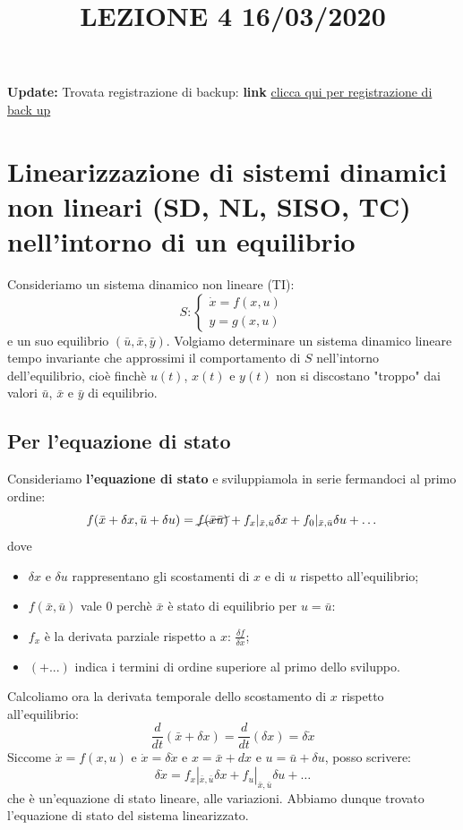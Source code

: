 \newpage
\title{LEZIONE 4 16/03/2020} \newline
\textbf{Update:} Trovata registrazione di backup: \textbf{link} \href{https://onedrive.live.com/?authkey=%21AATVJK3srNwxGzs&id=EE092FF4FF7B5B0E%212158&cid=EE092FF4FF7B5B0E}{clicca qui per registrazione di back up}
\section{Linearizzazione di sistemi dinamici non lineari (SD, NL, SISO, TC) nell'intorno di un equilibrio}
Consideriamo un sistema dinamico non lineare (TI):
\[
    S: \begin{cases}
        \dot{x} = f(x,u)\\
        y = g(x,u)
    \end{cases}
\]
e un suo equilibrio $(\bar{u}, \bar{x}, \bar{y})$.\newline
\newline
Volgiamo determinare un sistema dinamico lineare tempo invariante che approssimi il comportamento di $S$ nell'intorno dell'equilibrio, cioè finchè $u(t)$, $x(t)$ e $y(t)$ non si discostano "troppo" dai valori $\bar{u}$, $\bar{x}$ e $\bar{y}$ di equilibrio.
\subsection{Per l'equazione di stato}
Consideriamo \textbf{l'equazione di stato} e sviluppiamola in serie fermandoci al primo ordine:
\[
    f(\bar{x} + \delta x, \bar{u} + \delta u) = \cancel{ f(\bar{x} \bar{u})} + f_x|_{\bar{x}, \bar{u}}\delta x + f_0|_{\bar{x}, \bar{u}} \delta u + \dots
\]
dove
\begin{itemize}
    \item $\delta x$ e $\delta u$ rappresentano gli scostamenti di $x$ e di $u$ rispetto all'equilibrio;
    \item $f(\bar{x}, \bar{u})$ vale $0$ perchè $\bar{x}$ è stato di equilibrio per $u = \bar{u}$:
    \item $f_x$ è la derivata parziale rispetto a $x$: $\frac{\delta f}{\delta x}$;
    \item $(+ ...)$ indica i termini di ordine superiore al primo dello sviluppo.
\end{itemize}
Calcoliamo ora la derivata temporale dello scostamento di $x$ rispetto all'equilibrio:
\[
    \frac{d}{dt} (\bar{x} + \delta x) = \frac{d}{dt} (\delta x) = \delta \dot{x}
\]
Siccome $\dot{x} = f(x,u)$ e $\dot{x} = \delta \dot{x}$ e $x = \bar{x} + dx$ e $u = \bar{u} + \delta u$, posso scrivere:
\[
    \delta \dot{x} = f_x|_{\bar{x}, \bar{u}} \delta x + f_u |_{\bar{x}, \bar{u}} \delta u + \dots
\]
che è un'equazione di stato lineare, alle variazioni.\newline
\newline
Abbiamo dunque trovato l'equazione di stato del sistema linearizzato.
